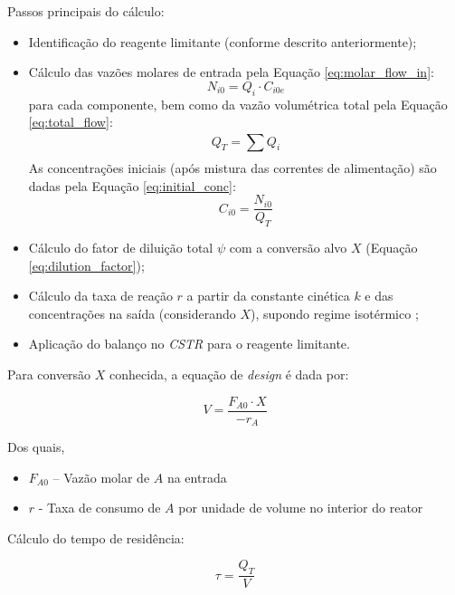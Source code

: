 Passos principais do cálculo:
\begin{itemize}
    \item Identificação do reagente limitante (conforme descrito anteriormente);
    \item Cálculo das vazões molares de entrada pela Equação \ref{eq:molar_flow_in}:
    \begin{equation}
    N_{i 0} = Q_{i} \cdot C_{i 0 e}
    \label{eq:molar_flow_in}
    \end{equation}
    para cada componente, bem como da vazão volumétrica total pela Equação \ref{eq:total_flow}:
    \begin{equation}
    Q_{T} = \sum_{}^{} Q_{i}
    \label{eq:total_flow}
    \end{equation}
    As concentrações iniciais (após mistura das correntes de alimentação) são dadas pela Equação \ref{eq:initial_conc}:
    \begin{equation}
    C_{i 0} = \frac{N_{i 0}}{Q_{T}}
    \label{eq:initial_conc}
    \end{equation}
    \item Cálculo do fator de diluição total $\psi$ com a conversão alvo $X$ (Equação \ref{eq:dilution_factor});
    \item Cálculo da taxa de reação $r$ a partir da constante cinética $k$ e das concentrações na saída (considerando $X$), supondo regime isotérmico \cite{fogler2009};
    \item Aplicação do balanço no \textit{CSTR} para o reagente limitante.
\end{itemize}

Para conversão $X$ conhecida, a equação de \textit{design} é dada por:

\begin{equation}
V = \frac{F_{A 0} \cdot X}{- r_{A}}
\label{eq:cstr_design}
\end{equation}

Dos quais,
\begin{itemize}
    \item $F_{A 0}$ – Vazão molar de $A$ na entrada
    \item $r$ - Taxa de consumo de $A$ por unidade de volume no interior do reator
\end{itemize}

Cálculo do tempo de residência:

\begin{equation}
\tau = \frac{Q_{T}}{V}
\label{eq:residence_time}
\end{equation}

